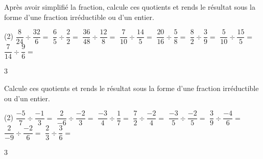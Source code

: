 \documentclass[a4paper,11pt]{report}
\begin{document}
\begin{exop}{
Après avoir simplifié la fraction, calcule ces quotients et rends le résultat sous la forme d'une fraction irréductible ou d'un entier.
\begin{tasks}(2)
	\task $\dfrac{8}{24}\div \dfrac{32}{6}=$
    \task $\dfrac{6}{5}\div \dfrac{2}{2}=$
	\task $\dfrac{36}{48}\div \dfrac{12}{8}=$
	\task $\dfrac{7}{10}\div \dfrac{14}{5}=$
    \task $\dfrac{20}{16}\div \dfrac{5}{8}=$
	\task $\dfrac{8}{2}\div \dfrac{3}{9}=$
	\task $\dfrac{5}{10}\div \dfrac{15}{5}=$
	\task $\dfrac{7}{14}\div \dfrac{9}{6}=$
\end{tasks}
}{3}
\end{exop}

\begin{exop}{
Calcule ces quotients et rends le résultat sous la forme d'une fraction irréductible ou d'un entier.
\begin{tasks}(2)
	\task $\dfrac{-5}{7}\div \dfrac{-1}{3}=$
    \task $\dfrac{2}{-6}\div \dfrac{-2}{3}=$
	\task $\dfrac{-3}{4}\div \dfrac{1}{7}=$
	\task $\dfrac{7}{2}\div \dfrac{-2}{4}=$
    \task $\dfrac{-3}{5}\div \dfrac{-2}{5}=$
	\task $\dfrac{3}{9}\div \dfrac{-4}{6}=$
	\task $\dfrac{2}{-9}\div \dfrac{-2}{6}=$
	\task $\dfrac{2}{3}\div \dfrac{3}{6}=$
\end{tasks}
}{3}
\end{exop}
\end{document}
